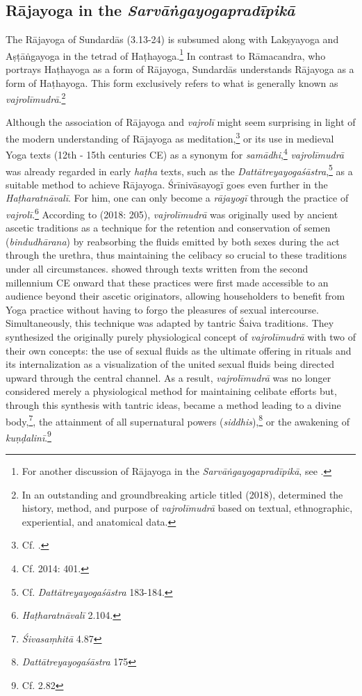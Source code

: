 \subsection{Rājayoga in the \emph{Sarvāṅgayogapradīpikā}}

The Rājayoga of Sundardās (3.13-24) is subsumed along with Lakṣyayoga and Aṣṭāṅgayoga in the tetrad of Haṭhayoga.\footnote{For another discussion of Rājayoga in the \emph{Sarvāṅgayogapradīpikā}, see \citeauthor[2014: 696-697]{burger2014sarvangayogapradipika}.} In contrast to Rāmacandra, who portrays Haṭhayoga as a form of Rājayoga, Sundardās understands Rājayoga as a form of Haṭhayoga. This form exclusively refers to what is generally known as \textit{vajrolīmudrā}.\footnote{In an outstanding and groundbreaking article titled  (2018), \citeauthor{mallinson2018vajrolimudra} determined the history, method, and purpose of \textit{vajrolīmudrā} based on textual, ethnographic, experiential, and anatomical data.}

Although the association of Rājayoga and \textit{vajrolī} might seem surprising in light of the modern understanding of Rājayoga as meditation,\footnote{Cf. \citeauthor[2004: 178-180]{demichelishistory2004}.} or its use in medieval Yoga texts (12th - 15th centuries CE) as a synonym for \textit{samādhi},\footnote{Cf. \citeauthor{birch2014} 2014: 401.} \textit{vajrolīmudrā} was already regarded in early \textit{haṭha} texts, such as the \emph{Dattātreyayogaśāstra},\footnote{Cf. \emph{Dattātreyayogaśāstra} 183-184.} as a suitable method to achieve Rājayoga. Śrīnivāsayogī goes even further in the \emph{Haṭharatnāvalī}. For him, one can only become a \textit{rājayogī} through the practice of \textit{vajrolī}.\footnote{\emph{Haṭharatnāvalī} 2.104.} According to \citeauthor{mallinson2018vajrolimudra} (2018: 205), \textit{vajrolīmudrā} was originally used by ancient ascetic traditions as a technique for the retention and conservation of semen (\textit{bindudhārana}) by reabsorbing the fluids emitted by both sexes during the act through the urethra, thus maintaining the celibacy so crucial to these traditions under all circumstances. \citeauthor{mallinson2018vajrolimudra} showed through texts written from the second millennium CE onward that these practices were first made accessible to an audience beyond their ascetic originators, allowing householders to benefit from Yoga practice without having to forgo the pleasures of sexual intercourse. Simultaneously, this technique was adapted by tantric Śaiva traditions. They synthesized the originally purely physiological concept of \textit{vajrolīmudrā} with two of their own concepts: the use of sexual fluids as the ultimate offering in rituals and its internalization as a visualization of the united sexual fluids being directed upward through the central channel. As a result, \textit{vajrolīmudrā} was no longer considered merely a physiological method for maintaining celibate efforts but, through this synthesis with tantric ideas, became a method leading to a divine body,\footnote{\emph{Śivasaṃhitā} 4.87}, the attainment of all supernatural powers (\textit{siddhis}),\footnote{\emph{Dattātreyayogaśāstra} 175} or the awakening of \textit{kuṇḍalinī}.\footnote{Cf.  2.82}

